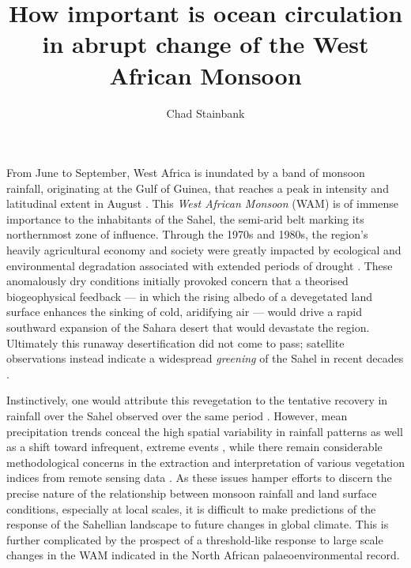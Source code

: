 \documentclass[a4paper]{article}
\begin{document}
\title{How important is ocean circulation in abrupt change of the West African Monsoon}
\author{Chad Stainbank}
\maketitle

From June to September, West Africa is inundated by a band of monsoon rainfall, originating at the Gulf of Guinea, that reaches a peak in intensity and latitudinal extent in August \parencite{sultan2003west}.
This \emph{West African Monsoon} (WAM) is of immense importance to the inhabitants of the Sahel, the semi-arid belt marking its northernmost zone of influence.
Through the 1970s and 1980s, the region's heavily agricultural economy and society were greatly impacted by ecological and environmental degradation associated with extended periods of drought \parencite{benson1998impact, olsson1993causes, walther2016review}.
These anomalously dry conditions initially provoked concern that a theorised biogeophysical feedback --- in which the rising albedo of a devegetated land surface enhances the sinking of cold, aridifying air \parencite{charney1975dynamics, charney1975drought} --- would drive a rapid southward expansion of the Sahara desert that would devastate the region.
Ultimately this runaway desertification did not come to pass; satellite observations instead indicate a widespread \emph{greening} of the Sahel in recent decades \parencite{olsson2005recent, dardel2014re}.

Instinctively, one would attribute this revegetation to the tentative recovery in rainfall over the Sahel observed over the same period \parencite{lebel2009recent}.
However, mean precipitation trends conceal the high spatial variability in rainfall patterns as well as a shift toward infrequent, extreme events \parencite{nicholson2013west, panthou2014recent}, while there remain considerable methodological concerns in the extraction and interpretation of various vegetation indices from remote sensing data \parencite{fensholt2013assessing, dardel2014rain}.
As these issues hamper efforts to discern the precise nature of the relationship between monsoon rainfall and land surface conditions, especially at local scales, it is difficult to make predictions of the response of the Sahellian landscape to future changes in global climate.
This is further complicated by the prospect of a threshold-like response to large scale changes in the WAM indicated in the North African palaeoenvironmental record.
\end{document}
